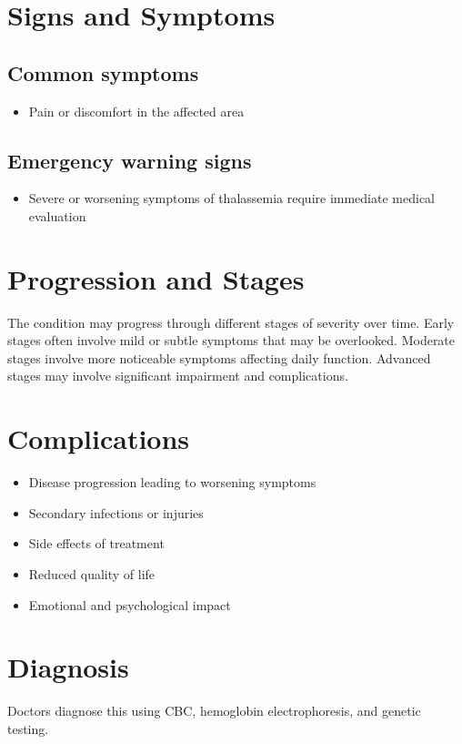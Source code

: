 \section{Signs and Symptoms}

\subsection{Common symptoms}
\begin{itemize}[noitemsep]
  \item Pain or discomfort in the affected area
  \end{itemize}

\subsection{Emergency warning signs}
\begin{itemize}[noitemsep]
  \item Severe or worsening symptoms of thalassemia require immediate medical evaluation
\end{itemize}
\section{Progression and Stages}
The condition may progress through different stages of severity over time. Early stages often involve mild or subtle symptoms that may be overlooked. Moderate stages involve more noticeable symptoms affecting daily function. Advanced stages may involve significant impairment and complications.
\section{Complications}
\begin{itemize}[noitemsep]
  \item Disease progression leading to worsening symptoms
  \item Secondary infections or injuries
  \item Side effects of treatment
  \item Reduced quality of life
  \item Emotional and psychological impact
\end{itemize}
\section{Diagnosis}
Doctors diagnose this using CBC, hemoglobin electrophoresis, and genetic testing.

